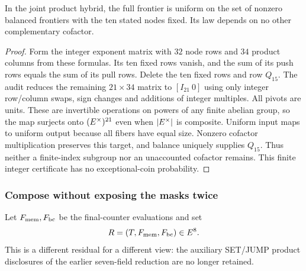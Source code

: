\begin{proposition}
In the joint product hybrid, the full frontier is uniform on the set of nonzero balanced frontiers with the ten stated nodes fixed. Its law depends on no other complementary cofactor.
\end{proposition}
\begin{proof}
Form the integer exponent matrix with $32$ node rows and $34$ product columns from these formulas. Its ten fixed rows vanish, and the sum of its push rows equals the sum of its pull rows. Delete the ten fixed rows and row $Q_{15}$. The audit reduces the remaining $21\times34$ matrix to $[I_{21}\ 0]$ using only integer row/column swaps, sign changes and additions of integer multiples. All pivots are units. These are invertible operations on powers of any finite abelian group, so the map surjects onto $(E^\times)^{21}$ even when $|E^\times|$ is composite. Uniform input maps to uniform output because all fibers have equal size. Nonzero cofactor multiplication preserves this target, and balance uniquely supplies $Q_{15}$. Thus neither a finite-index subgroup nor an unaccounted cofactor remains. This finite integer certificate has no exceptional-coin probability.
\end{proof}

\subsubsection{Compose without exposing the masks twice}

Let $F_{\rm mem},F_{\rm bc}$ be the final-counter evaluations and set
\[
 R=(T,F_{\rm mem},F_{\rm bc})\in E^8.
\]
This is a different residual for a different view: the auxiliary SET/JUMP product disclosures of the earlier seven-field reduction are no longer retained.

